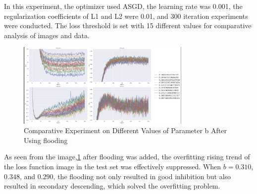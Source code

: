 \documentclass[a4paper,fleqn]{cas-sc}
\begin{document}
In this experiment, the optimizer used ASGD, the learning rate was 0.001, the regularization coefficients of L1 and L2 were 0.01, and 300 iteration experiments were conducted. The loss threshold is set with 15 different values for comparative analysis of images and data.
\begin{figure}
\centering
\includegraphics[width=0.75\textwidth]{figs_rev1/f7.png}
\caption{Comparative Experiment on Different Values of Parameter b After Using flooding}
\label{fig:f7}
\end{figure}

As seen from the image,\ref{fig:f7} after flooding was added, the overfitting rising trend of the loss function image in the test set was effectively suppressed. When $b=0.310$, $0.348$, and $0.290$, the flooding not only resulted in good inhibition but also resulted in secondary descending, which solved the overfitting problem.
\end{document}
